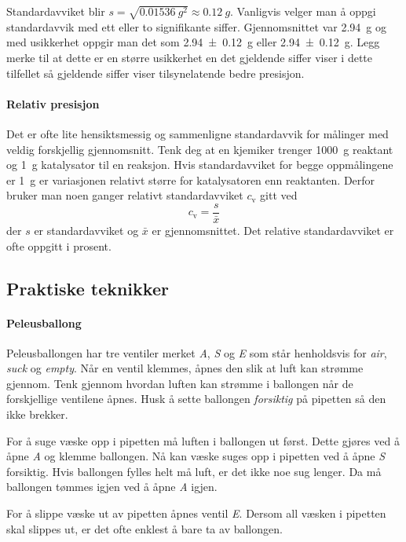 \documentclass[hidelinks,12pt,norsk,a4paper,fleqn]{scrartcl}
\begin{document}
	Standardavviket blir $s=\sqrt{\SI{0.01536}{g^2}}\approx\SI{0.12}{g}$. Vanligvis velger man å oppgi standardavvik med ett eller to signifikante siffer. Gjennomsnittet var \SI{2.94}{g} og med usikkerhet oppgir man det som \SI{2.94 +- 0.12}{g} eller \SI[separate-uncertainty=true]{2.94 +- 0.12}{g}. Legg merke til at dette er en større usikkerhet en det gjeldende siffer viser i dette tilfellet så gjeldende siffer viser tilsynelatende bedre presisjon.
	
	\paragraph{Relativ presisjon}
	Det er ofte lite hensiktsmessig og sammenligne standardavvik for målinger med veldig forskjellig gjennomsnitt. Tenk deg at en kjemiker trenger \SI{1000}{g} reaktant og \SI{1}{g} katalysator til en reaksjon. Hvis standardavviket for begge oppmålingene er \SI{1}{g} er variasjonen relativt større for katalysatoren enn reaktanten. Derfor bruker man noen ganger relativt standardavviket $c_\mathrm{v}$ gitt ved
	\begin{equation*}
		c_\mathrm{v}=\frac{s}{\bar{x}}
	\end{equation*}
	der $s$ er standardavviket og $\bar{x}$ er gjennomsnittet. Det relative standardavviket er ofte oppgitt i prosent.
		
	\subsection{Praktiske teknikker}
	
	\paragraph{Peleusballong}
	Peleusballongen har tre ventiler merket \emph{A}, \emph{S} og \emph{E} som står henholdsvis for \emph{air}, \emph{suck} og \emph{empty}. Når en ventil klemmes, åpnes den slik at luft kan strømme gjennom. Tenk gjennom hvordan luften kan strømme i ballongen når de forskjellige ventilene åpnes. Husk å sette ballongen \emph{forsiktig} på pipetten så den ikke brekker.
	
	For å suge væske opp i pipetten må luften i ballongen ut først. Dette gjøres ved å åpne \emph{A} og klemme ballongen. Nå kan væske suges opp i pipetten ved å åpne \emph{S} forsiktig. Hvis ballongen fylles helt må luft, er det ikke noe sug lenger. Da må ballongen tømmes igjen ved å åpne \emph{A} igjen.
	
	For å slippe væske ut av pipetten åpnes ventil \emph{E}. Dersom all væsken i pipetten skal slippes ut, er det ofte enklest å bare ta av ballongen.
	
\end{document}
